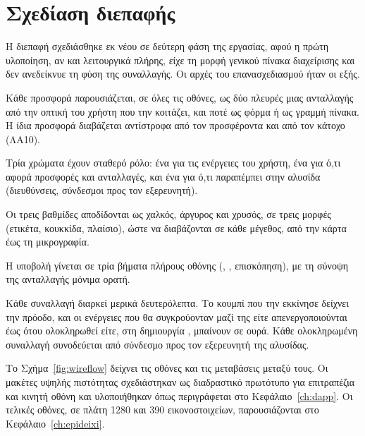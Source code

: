 \section{Σχεδίαση διεπαφής}
\label{sec:ui-design}

Η διεπαφή σχεδιάσθηκε εκ νέου σε δεύτερη φάση της εργασίας, αφού η πρώτη υλοποίηση, αν και
λειτουργικά πλήρης, είχε τη μορφή γενικού πίνακα διαχείρισης και δεν ανεδείκνυε τη φύση
της συναλλαγής. Οι αρχές του επανασχεδιασμού ήταν οι εξής.

\begin{description}[leftmargin=1.2em,itemsep=2pt]
  \item[«Δίνεις \swap{} παίρνεις».] Κάθε προσφορά παρουσιάζεται, σε όλες τις οθόνες, ως δύο
    πλευρές μιας ανταλλαγής από την οπτική του χρήστη που την κοιτάζει, και ποτέ ως φόρμα ή
    ως γραμμή πίνακα. Η ίδια προσφορά διαβάζεται αντίστροφα από τον προσφέροντα και από
    τον κάτοχο (ΛΑ10).
  \item[Χρώμα με σημασία.] Τρία χρώματα έχουν σταθερό ρόλο: ένα για τις ενέργειες του
    χρήστη, ένα για ό,τι αφορά προσφορές και ανταλλαγές, και ένα για ό,τι παραπέμπει στην
    αλυσίδα (διευθύνσεις, σύνδεσμοι προς τον εξερευνητή).
  \item[Σπανιότητα ως \en{badge}.] Οι τρεις βαθμίδες αποδίδονται ως χαλκός, άργυρος και
    χρυσός, σε τρεις μορφές (ετικέτα, κουκκίδα, πλαίσιο), ώστε να διαβάζονται σε κάθε
    μέγεθος, από την κάρτα έως τη μικρογραφία.
  \item[Σύνθεση προσφοράς σε βήματα.] Η υποβολή γίνεται σε τρία βήματα πλήρους οθόνης
    (, , επισκόπηση), με τη σύνοψη της ανταλλαγής μόνιμα ορατή.
  \item[Ορατή εκκρεμότητα.] Κάθε συναλλαγή διαρκεί μερικά δευτερόλεπτα. Το κουμπί που την
    εκκίνησε δείχνει την πρόοδο, και οι ενέργειες που θα συγκρούονταν μαζί της είτε
    απενεργοποιούνται έως ότου ολοκληρωθεί είτε, στη δημιουργία , μπαίνουν σε ουρά.
    Κάθε ολοκληρωμένη συναλλαγή συνοδεύεται από σύνδεσμο προς τον εξερευνητή της αλυσίδας.
\end{description}

Το Σχήμα~\ref{fig:wireflow} δείχνει τις οθόνες και τις μεταβάσεις μεταξύ τους. Οι
μακέτες υψηλής πιστότητας σχεδιάστηκαν ως διαδραστικό πρωτότυπο  για
επιτραπέζια και κινητή οθόνη και υλοποιήθηκαν όπως περιγράφεται στο
Κεφάλαιο~\ref{ch:dapp}. Οι τελικές οθόνες, σε πλάτη 1280 και 390 εικονοστοιχείων,
παρουσιάζονται στο Κεφάλαιο~\ref{ch:epideixi}.


